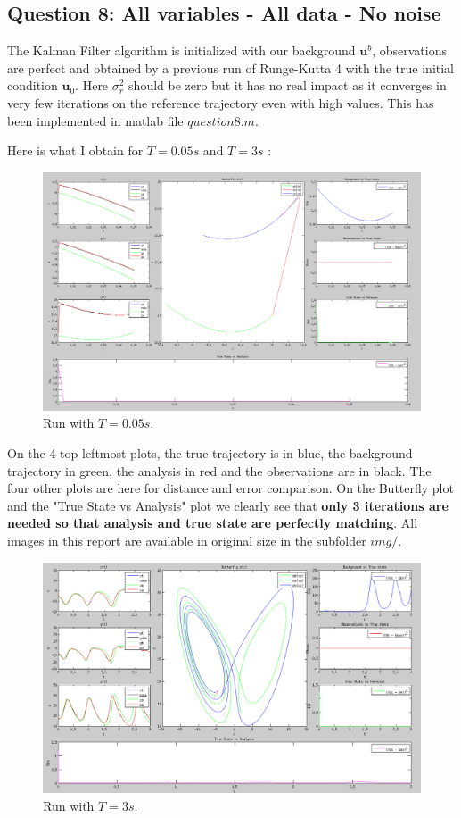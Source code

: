 \documentclass[11pt,a4paper]{article}
\renewcommand{\u} {\mathbf{u}}
\begin{document}
\subsection{Question 8: All variables - All data - No noise}

The Kalman Filter algorithm is initialized with our background $\u^b$, observations are perfect and obtained by a previous run of Runge-Kutta 4 with the true initial condition $\u_0$. Here $\sigma_r^2$ should be zero but it has no real impact as it converges in very few iterations on the reference trajectory even with high values. This has been implemented in matlab file $question8.m$.

\vskip 0.3cm
Here is what I obtain for $T = 0.05s$ and $T = 3s$ :

\begin{figure}[H]
   \includegraphics[width=16cm]{Q8a.png}
   \caption{Run with $T = 0.05s$.}
\end{figure}

On the 4 top leftmost plots, the true trajectory is in blue, the background trajectory in green, the analysis in red and the observations are in black. The four other plots are here for distance and error comparison. On the Butterfly plot and the "True State vs Analysis" plot we clearly see that \textbf{only 3 iterations are needed so that analysis and true state are perfectly matching}. All images in this report are available in  original size in the subfolder $img/$.

\begin{figure}[H]
   \includegraphics[width=16cm]{Q8b.png}
   \caption{Run with $T = 3s$.}
\end{figure}
\end{document}
